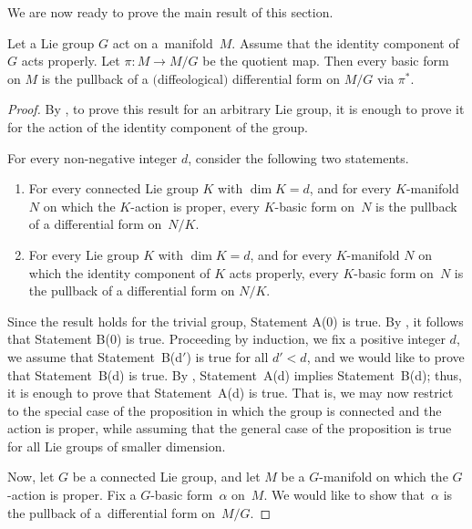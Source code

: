 We are now ready to prove the main result of this section.

\begin{Proposition}
\label{p:geomquot}
Let a Lie group $G$ act on a~mani\-fold~$M$.
Assume that the identity component of~$G$ acts properly.
Let $\pi \colon M \to M/G$ be the quotient map.
Then every basic form on $M$ is the pullback of a $($diffeological$)$ differential
form on $M/G$ via $\pi^*$.
\end{Proposition}

\begin{proof}
By , to prove this result
for an arbitrary Lie group, it is enough to prove it
for the action of the identity component of the group.

For every non-negative integer $d$, consider the following two statements.
\begin{enumerate}\itemsep=0pt
\item[A(d):]
For every connected Lie group $K$ with $\dim K = d$,
and for every $K$-manifold $N$ on which the $K$-action is proper,
every $K$-basic form on~$N$ is the pullback of a dif\/ferential form on~$N/K$.

\item[B(d):]
For every Lie group $K$ with $\dim K = d$,
and for every $K$-manifold $N$ on which the identity component of $K$
acts properly, every $K$-basic form on~$N$ is the pullback
of a dif\/ferential form on $N/K$.
\end{enumerate}

Since the result holds for the trivial group, Statement A(0) is true.
By , it follows that Statement B(0) is true.
Proceeding by induction, we f\/ix a positive integer $d$,
we assume that Statement~B(d$'$) is true for all $d' < d$,
and we would like to prove that Statement~B(d) is true.
By , Statement~A(d) implies Statement~B(d);
thus, it is enough to prove that Statement~A(d) is true.
That is, we may now restrict to the special case of the proposition
in which the group is connected and the action is proper,
while assuming that the general case of the proposition is true
for all Lie groups of smaller dimension.

Now, let $G$ be a connected Lie group,
and let $M$ be a $G$-manifold on which the $G$-action is proper.
Fix a $G$-basic form~$\alpha$ on~$M$.
We would like to show that~$\alpha$ is the pullback of a~dif\/ferential form
on~$M/G$.


\end{proof}
